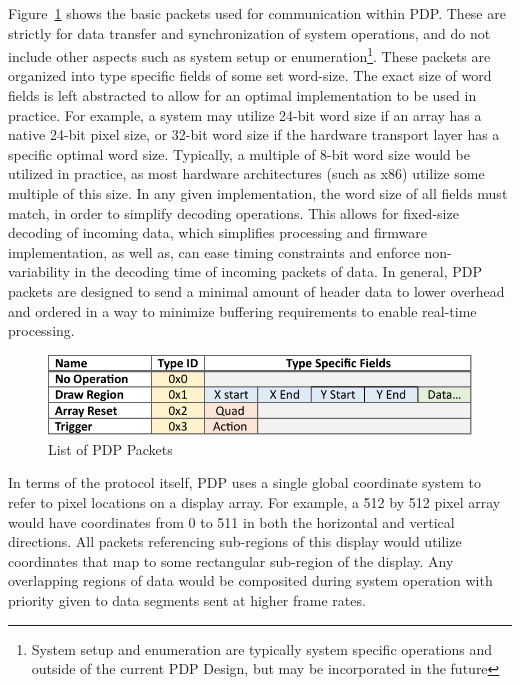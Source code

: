     Figure~\ref{fig:packets} shows the basic packets used for communication within PDP. These are strictly for data transfer and synchronization of system operations, and do not include other aspects such as system setup or enumeration\footnote{System setup and enumeration are typically system specific operations and outside of the current PDP Design, but may be incorporated in the future}. These packets are organized into type specific fields of some set word-size. The exact size of word fields is left abstracted to allow for an optimal implementation to be used in practice. For example, a system may utilize 24-bit word size if an array has a native 24-bit pixel size, or 32-bit word size if the hardware transport layer has a specific optimal word size. Typically, a multiple of 8-bit word size would be utilized in practice, as most hardware architectures (such as x86) utilize some multiple of this size. In any given implementation, the word size of all fields must match, in order to simplify decoding operations. This allows for fixed-size decoding of incoming data, which simplifies processing and firmware implementation, as well as, can ease timing constraints and enforce non-variability in the decoding time of incoming packets of data. In general, PDP packets are designed to send a minimal amount of header data to lower overhead and ordered in a way to minimize buffering requirements to enable real-time processing.

    \begin{figure}
        \centering
        \includegraphics[width=1.0\textwidth]{fig/packet_chart.pdf}
        \caption{List of PDP Packets}
        \label{fig:packets}
    \end{figure}

    In terms of the protocol itself, PDP uses a single global coordinate system to refer to pixel locations on a display array. For example, a 512 by 512 pixel array would have coordinates from 0 to 511 in both the horizontal and vertical directions. All packets referencing sub-regions of this display would utilize coordinates that map to some rectangular sub-region of the display. Any overlapping regions of data would be composited during system operation with priority given to data segments sent at higher frame rates.

